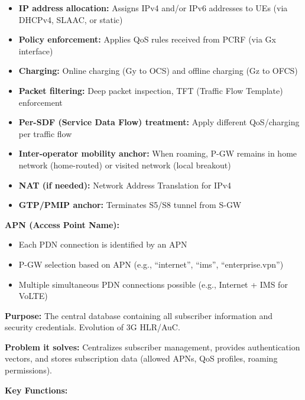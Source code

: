 \begin{itemize}
\tightlist
\item
  \textbf{IP address allocation:} Assigns IPv4 and/\allowbreak{}or IPv6 addresses to UEs (via DHCPv4, SLAAC, or static)
\item
  \textbf{Policy enforcement:} Applies QoS rules received from PCRF (via Gx interface)
\item
  \textbf{Charging:} Online charging (Gy to OCS) and offline charging (Gz to OFCS)
\item
  \textbf{Packet filtering:} Deep packet inspection, TFT (Traffic Flow Template) enforcement
\item
  \textbf{Per-SDF (Service Data Flow) treatment:} Apply different QoS/\allowbreak{}charging per traffic flow
\item
  \textbf{Inter-operator mobility anchor:} When roaming, P-GW remains in home network (home-routed) or visited network (local breakout)
\item
  \textbf{NAT (if needed):} Network Address Translation for IPv4
\item
  \textbf{GTP/\allowbreak{}PMIP anchor:} Terminates S5/\allowbreak{}S8 tunnel from S-GW
\end{itemize}

\textbf{APN (Access Point Name):}

\begin{itemize}
\tightlist
\item
  Each PDN connection is identified by an APN
\item
  P-GW selection based on APN (e.g., ``internet'', ``ims'', ``enterprise.vpn'')
\item
  Multiple simultaneous PDN connections possible (e.g., Internet + IMS for VoLTE)
\end{itemize}


\textbf{Purpose:} The central database containing all subscriber information and security credentials. Evolution of 3G HLR/\allowbreak{}AuC.

\textbf{Problem it solves:} Centralizes subscriber management, provides authentication vectors, and stores subscription data (allowed APNs, QoS profiles, roaming permissions).

\textbf{Key Functions:}


